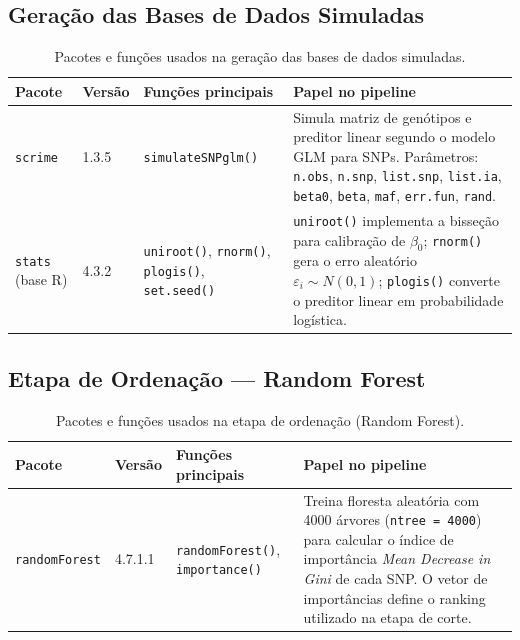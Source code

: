 \documentclass[
    12pt,
    a4paper,
    oneside,
    english,
    french,
    spanish,
    brazil
    ]{abntex2}
\renewcommand{\arraystretch}{1.3}
\newcommand{\novo}[1]{\textcolor{corNova}{#1}}
\begin{document}
\subsection*{Geração das Bases de Dados Simuladas}

\begin{table}[H]
\centering
\caption{\novo{Pacotes e funções usados na geração das bases de dados simuladas.}}
\label{tab:pkgs_simulacao}
\small
\renewcommand{\arraystretch}{1.35}
\begin{tabular}{L{2.4cm}|C{1.4cm}|L{4.2cm}|L{5.4cm}}
\hline
\textbf{Pacote} & \textbf{Versão} & \textbf{Funções principais} & \textbf{Papel no pipeline} \\
\hline
\texttt{scrime} & 1.3.5 &
  \texttt{simulateSNPglm()} &
  Simula matriz de genótipos e preditor linear segundo o modelo GLM para SNPs. Parâmetros: \texttt{n.obs}, \texttt{n.snp}, \texttt{list.snp}, \texttt{list.ia}, \texttt{beta0}, \texttt{beta}, \texttt{maf}, \texttt{err.fun}, \texttt{rand}. \\
\hline
\texttt{stats} (base R) & 4.3.2 &
  \texttt{uniroot()}, \texttt{rnorm()}, \texttt{plogis()}, \texttt{set.seed()} &
  \texttt{uniroot()} implementa a bisseção para calibração de $\beta_0$; \texttt{rnorm()} gera o erro aleatório $\varepsilon_i \sim N(0,1)$; \texttt{plogis()} converte o preditor linear em probabilidade logística. \\
\hline
\end{tabular}
\end{table}

\subsection*{Etapa de Ordenação --- Random Forest}

\begin{table}[H]
\centering
\caption{\novo{Pacotes e funções usados na etapa de ordenação (Random Forest).}}
\label{tab:pkgs_rf}
\small
\renewcommand{\arraystretch}{1.35}
\begin{tabular}{L{2.4cm}|C{1.4cm}|L{4.2cm}|L{5.4cm}}
\hline
\textbf{Pacote} & \textbf{Versão} & \textbf{Funções principais} & \textbf{Papel no pipeline} \\
\hline
\texttt{randomForest} & 4.7.1.1 &
  \texttt{randomForest()}, \texttt{importance()} &
  Treina floresta aleatória com 4000 árvores (\texttt{ntree = 4000}) para calcular o índice de importância \textit{Mean Decrease in Gini} de cada SNP. O vetor de importâncias define o ranking utilizado na etapa de corte. \\
\hline
\end{tabular}
\end{table}
\end{document}
